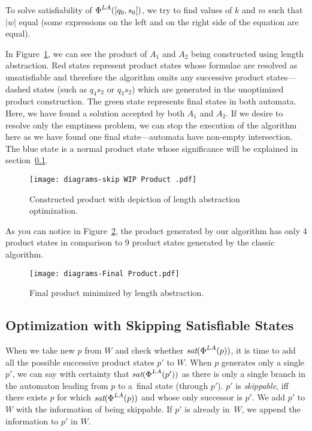 To solve satisfiability of $\emph{$\Phi$}^{LA}([q_0, s_0])$, we try to find values of $k$ and $m$ such that $|w|$ equal (some expressions on the left and on the right side of the equation are equal).

In Figure~\ref{fig:product_WIP}, we can see the product of $A_1$ and $A_2$ being constructed using length abstraction. Red states represent product states whose formulae are resolved as unsatisfiable and therefore the algorithm omits any successive product states---dashed states (such as $q_4s_2$ or $q_3s_2$) which are generated in the unoptimized product construction. The green state represents final states in both automata. Here, we have found a solution accepted by both $A_1$ and $A_2$. If we desire to resolve only the emptiness problem, we can stop the execution of the algorithm here as we have found one final state---automata have non-empty intersection. The blue state is a normal product state whose significance will be explained in section~\ref{sec:skipping states}.

\begin{figure}[ht]
	\centering
	\texttt{[image: diagrams-skip WIP Product .pdf]}
	\caption{Constructed product with depiction of length abstraction optimization.}
	\label{fig:product_WIP}
\end{figure}

As you can notice in Figure~\ref{fig:product_final}, the product generated by our algorithm has only 4 product states in comparison to 9 product states generated by the classic algorithm.

\begin{figure}[ht]
	\centering
	\texttt{[image: diagrams-Final Product.pdf]}
	\caption{Final product minimized by length abstraction.}
	\label{fig:product_final}
\end{figure}


\subsection{Optimization with Skipping Satisfiable States} \label{sec:skipping states}

When we take new $p$ from $W$ and check whether $\emph{sat}(\emph{$\Phi$}^{LA}(p))$, it is time to add all the possible successive product states $p'$ to $W$. When $p$ generates only a single $p'$, we can say with certainty that $\emph{sat}(\emph{$\Phi$}^{LA}(p'))$ as there is only a single branch in the automaton leading from $p$ to a~final state (through $p'$). $p'$ is \emph{skippable}, iff there exists $p$ for which $\emph{sat}(\emph{$\Phi$}^{LA}(p))$ and whose only successor is $p'$. We add $p'$ to $W$ with the information of being skippable. If $p'$ is already in~$W$, we append the information to $p'$ in $W$.

